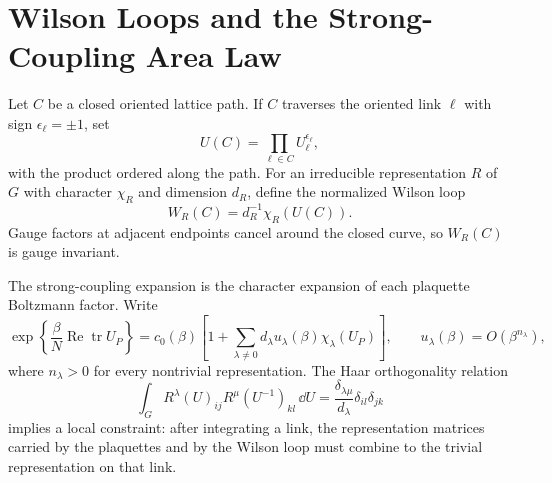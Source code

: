 \section{Wilson Loops and the Strong-Coupling Area Law}

Let \(C\) be a closed oriented lattice path.  If \(C\) traverses the oriented
link \(\ell\) with sign \(\epsilon_\ell=\pm1\), set
\[
  U(C)=\prod_{\ell\in C}U_\ell^{\epsilon_\ell},
\]
with the product ordered along the path.  For an irreducible representation
\(R\) of \(G\) with character \(\chi_R\) and dimension \(d_R\), define the
normalized Wilson loop
\begin{equation}
  W_R(C)
  =
  d_R^{-1}\chi_R(U(C)).
  \label{eq:lattice-wilson-loop-definition}
\end{equation}
Gauge factors at adjacent endpoints cancel around the closed curve, so
\(W_R(C)\) is gauge invariant.

The strong-coupling expansion is the character expansion of each plaquette
Boltzmann factor.  Write
\begin{equation}
  \exp\left\{\frac{\beta}{N}
  \operatorname{Re}\operatorname{tr}U_P\right\}
  =
  c_0(\beta)
  \left[
    1+\sum_{\lambda\neq 0}d_\lambda u_\lambda(\beta)\chi_\lambda(U_P)
  \right],
  \qquad
  u_\lambda(\beta)=O(\beta^{n_\lambda}),
  \label{eq:lattice-character-expansion}
\end{equation}
where \(n_\lambda>0\) for every nontrivial representation.  The Haar
orthogonality relation
\begin{equation}
  \int_G
  R^\lambda(U)_{ij}R^\mu(U^{-1})_{kl}\,\dd U
  =
  \frac{\delta_{\lambda\mu}}{d_\lambda}
  \delta_{il}\delta_{jk}
  \label{eq:lattice-haar-orthogonality}
\end{equation}
implies a local constraint: after integrating a link, the representation
matrices carried by the plaquettes and by the Wilson loop must combine to the
trivial representation on that link.

